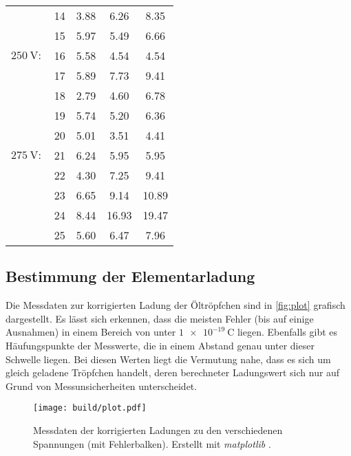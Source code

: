 \begin{table}
\begin{tabular}{c l S[table-format = 1.2] S[table-format = 2.2] S}
        {                   } & {14} & 3.88 &  6.26 &  8.35 \\
        {                   } & {15} & 5.97 &  5.49 &  6.66 \\
        {$\qty{250}{\volt}:$} & {16} & 5.58 &  4.54 &  4.54 \\
        {                   } & {17} & 5.89 &  7.73 &  9.41 \\
        {                   } & {18} & 2.79 &  4.60 &  6.78 \\
        {                   } & {19} & 5.74 &  5.20 &  6.36 \\
        {                   } & {20} & 5.01 &  3.51 &  4.41 \\
        {$\qty{275}{\volt}:$} & {21} & 6.24 &  5.95 &  5.95 \\
        {                   } & {22} & 4.30 &  7.25 &  9.41 \\
        {                   } & {23} & 6.65 &  9.14 & 10.89 \\
        {                   } & {24} & 8.44 & 16.93 & 19.47 \\
        {                   } & {25} & 5.60 &  6.47 &  7.96 \\
      \bottomrule
    \end{tabular}
  \end{table}

\subsection{Bestimmung der Elementarladung}
\label{subsec:Elementarladung}

Die Messdaten zur korrigierten Ladung der Öltröpfchen sind in \autoref{fig:plot} grafisch dargestellt. Es lässt sich erkennen, dass die meisten Fehler 
(bis auf einige Ausnahmen) in einem Bereich von unter $\qty{1e-19}{\coulomb}$ liegen. Ebenfalls gibt es Häufungspunkte der Messwerte, die in einem 
Abstand genau unter dieser Schwelle liegen. Bei diesen Werten liegt die Vermutung nahe, dass es sich um gleich geladene Tröpfchen handelt, deren
berechneter Ladungswert sich nur auf Grund von Messunsicherheiten unterscheidet.

\begin{figure}
    \centering
    \texttt{[image: build/plot.pdf]}
    \caption{Messdaten der korrigierten Ladungen zu den verschiedenen Spannungen (mit Fehlerbalken). Erstellt mit \textit{matplotlib} \cite{matplotlib}.}
    \label{fig:plot}
\end{figure}

